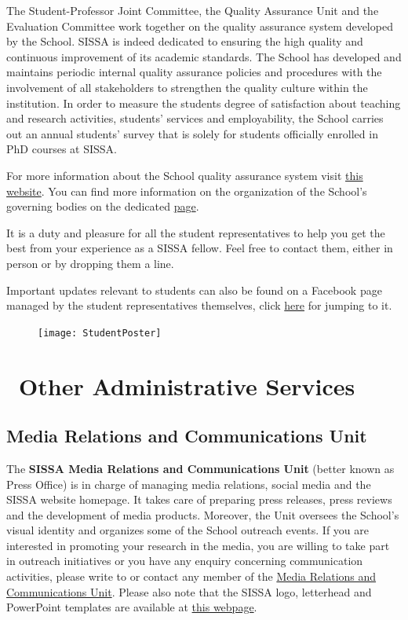 \documentclass{sissavademecum}
\begin{document}
The Student-Professor Joint Committee, the Quality Assurance Unit and the Evaluation Committee work together on the quality assurance system developed by the School. SISSA is indeed dedicated to ensuring the high quality and continuous improvement of its academic standards. The School has developed and maintains periodic internal quality assurance policies and procedures with the involvement of all stakeholders to strengthen the quality culture within the institution. In order to measure the students degree of satisfaction about teaching and research activities, students' services and employability, the School carries out an annual students' survey that is solely for students officially enrolled in PhD courses at SISSA.

For more information about the School quality assurance system visit \href{https://www.sissa.it/qualita}{this website}. You can find more information on the organization of the School's governing bodies on the dedicated \href{https://www.sissa.it/general-organization}{page}.

It is a duty and pleasure for all the student representatives to help you get the best from your experience as a SISSA fellow. Feel free to contact them, either in person or by dropping them a line.

Important updates relevant to students can also be found on a Facebook page managed by the student representatives themselves, click \href{https://www.facebook.com/groups/sissastudents/}{here} for jumping to it.

\begin{figure}
	\vspace*{-12pt}
	\texttt{[image: StudentPoster]}
\end{figure}




\chapter{\texorpdfstring{\faChartBar\ }{}Other Administrative Services}


\section{Media Relations and Communications Unit}

The \textbf{SISSA Media Relations and Communications Unit} (better known as Press Office) is in charge of managing media relations, social media and the SISSA website homepage. It takes care of preparing press releases, press reviews and the development of media products. Moreover, the Unit oversees the School's visual identity and organizes some of the School outreach events. If you are interested in promoting your research in the media, you are willing to take part in outreach initiatives or you have any enquiry concerning communication activities, please write to  or contact any member of the \href{https://www.sissa.it/media-and-press}{Media Relations and Communications Unit}. Please also note that the SISSA logo, letterhead and PowerPoint templates are available at \href{https://www.sissa.it/researchers-and-sissa-staff}{this webpage}.
\end{document}
